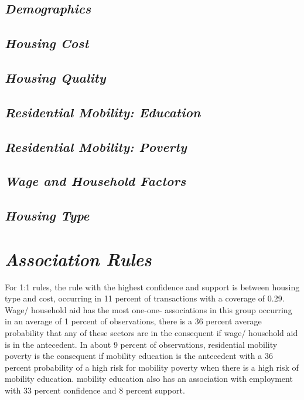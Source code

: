 \subsection{\textit{Demographics}}

\subsection{\textit{Housing Cost}}

\subsection{\textit{Housing Quality}}

\subsection{\textit{Residential Mobility: Education}}

\subsection{\textit{Residential Mobility: Poverty}}

\subsection{\textit{Wage and Household Factors}}

\subsection{\textit{Housing Type}}






\section{\textit{Association Rules}}
For 1:1 rules, the rule with the highest confidence and support is between housing type and cost, occurring in 11 percent of transactions with a coverage of 0.29. Wage/ household aid has the most one-one- associations in this group occurring in an average of 1 percent of observations, there is a 36 percent average probability that any of these sectors are in the consequent if wage/ household aid is in the antecedent. In about 9 percent of observations, residential mobility poverty is the consequent if mobility education is the antecedent with a 36 percent probability of a high risk for mobility poverty when there is a high risk of mobility education. mobility education also has an association with employment with 33 percent confidence and 8 percent support. 


